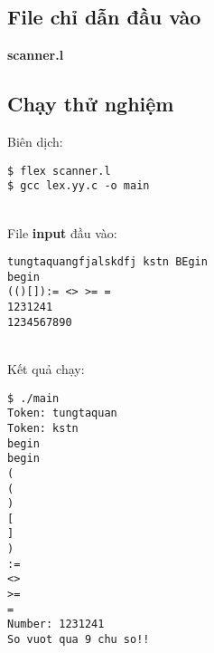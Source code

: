 \documentclass[../report.tex]{subfiles}
\begin{document}
\subsection{File chỉ dẫn đầu vào}
\textbf{scanner.l}


\subsection{Chạy thử nghiệm}
Biên dịch:
\begin{verbatim}
$ flex scanner.l
$ gcc lex.yy.c -o main
\end{verbatim}
\HRule\\
File \textbf{input} đầu vào: 
\begin{verbatim}
tungtaquangfjalskdfj kstn BEgin
begin
(()[]):= <> >= =
1231241
1234567890
\end{verbatim}
\HRule\\
Kết quả chạy: 
\begin{verbatim}
$ ./main
Token: tungtaquan
Token: kstn
begin
begin
(
(
)
[
]
)
:=
<>
>=
=
Number: 1231241
So vuot qua 9 chu so!!
\end{verbatim}
\end{document}
